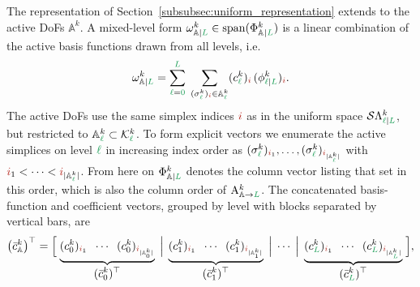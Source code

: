 \documentclass[a4paper, 12pt]{article}
\newcommand{\guidance}[1]{{\color{lime!70!black} #1}}
\newcommand{\green}{\color{ForestGreen}}
\newcommand{\brickred}{\color{BrickRed}}
\newcommand{\K}{\mathcal{K}}
\newcommand{\simplexname}{\sigma}
\newcommand{\simplex}[3]{\freeQ{\simplexname}{#1}{#2}{#3}}
\newcommand{\coarseIdxone}{{\brickred i}}
\renewcommand{\l}{{\green\ell}}
\renewcommand{\L}{{\green L}}
\newcommand{\lzero}{{\green 0}}
\newcommand{\constrQ}[5]{ ( {#1}^{#2}_{#3 \vert #4} )_{#5}} %
\newcommand{\constrVec}[4]{ {#1}^{#2}_{#3 \vert #4} }
\newcommand{\freeQ}[4]{ ( {#1}^{#2}_{#3} )_{#4}}
\newcommand{\freeVec}[3]{ {#1}^{#2}_{#3}}
\newcommand{\Amat}[3]{\mathbf{\mathrm{A}}^{#1}_{#2 \to #3}}
\newcommand{\SDFspace}[3]{\mathcal{S}\Lambda^{#1}_{#2 \vert #3}}
\newcommand{\SDFbasis}{\phi}
\newcommand{\SDFbases}{\Phi}
\newcommand{\activeDoFs}{\mathbb{A}}
\newcommand{\activeDoFSet}[2]{\activeDoFs^{#1}_{#2}}
\theoremstyle{definition}
\theoremstyle{plain}
\numberwithin{equation}{section}
\begin{document}
The representation of Section~\ref{subsubsec:uniform_representation} extends to the active DoFs $\activeDoFSet{k}{}$. A mixed-level form $\constrVec{\omega}{k}{\activeDoFs}{\L} \in \mathrm{span}(\constrVec{\SDFbases}{k}{\activeDoFSet{}{}}{\L})$ is a linear combination of the active basis functions drawn from all levels, i.e.
\begin{equation}
    \label{eq:hierarchical_form_sum}
    \constrVec{\omega}{k}{\activeDoFs}{\L}
    = \sum\limits_{\l=\lzero}^{\L} \; \sum\limits_{\simplex{k}{\l}{\coarseIdxone} \in \activeDoFSet{k}{\l}}
        \freeQ{c}{k}{\l}{\coarseIdxone} \, \constrQ{\SDFbasis}{k}{\l}{\L}{\coarseIdxone}.
\end{equation}
The active DoFs use the same simplex indices $\coarseIdxone$ as in the uniform space $\SDFspace{k}{\l}{\L}$, but restricted to $\activeDoFSet{k}{\l} \subset \K^k_\l$. To form explicit vectors we enumerate the active simplices on level $\l$ in increasing index order as $\simplex{k}{\l}{\coarseIdxone_1}, \ldots, \simplex{k}{\l}{\coarseIdxone_{|\activeDoFSet{k}{\l}|}}$ with $\coarseIdxone_1 < \cdots < \coarseIdxone_{|\activeDoFSet{k}{\l}|}$. \guidance{From here on $\constrVec{\SDFbases}{k}{\activeDoFs}{\L}$ denotes the column vector listing that set in this order, which is also the column order of $\Amat{k}{\activeDoFs}{\L}$.} The concatenated basis-function and coefficient vectors, grouped by level with blocks separated by vertical bars, are
\begin{equation}
    \label{eq:hierarchical_dof_vector}
    \big(\freeVec{\bar{c}}{k}{\activeDoFs}\big)^\top
    = \Bigl[\;
        \underbrace{
            \freeQ{c}{k}{0}{\coarseIdxone_1}
            \;\; \cdots \;\;
            \freeQ{c}{k}{0}{\coarseIdxone_{|\activeDoFSet{k}{0}|}}
        }_{\displaystyle (\freeVec{\bar{c}}{k}{0})^\top}
        \;\Big|\;
        \underbrace{
            \freeQ{c}{k}{1}{\coarseIdxone_1}
            \;\; \cdots \;\;
            \freeQ{c}{k}{1}{\coarseIdxone_{|\activeDoFSet{k}{1}|}}
        }_{\displaystyle (\freeVec{\bar{c}}{k}{1})^\top}
        \;\Big|\;
        \cdots
        \;\Big|\;
        \underbrace{
            \freeQ{c}{k}{\L}{\coarseIdxone_1}
            \;\; \cdots \;\;
            \freeQ{c}{k}{\L}{\coarseIdxone_{|\activeDoFSet{k}{\L}|}}
        }_{\displaystyle (\freeVec{\bar{c}}{k}{\L})^\top}
    \;\Bigr],
\end{equation}
\end{document}
